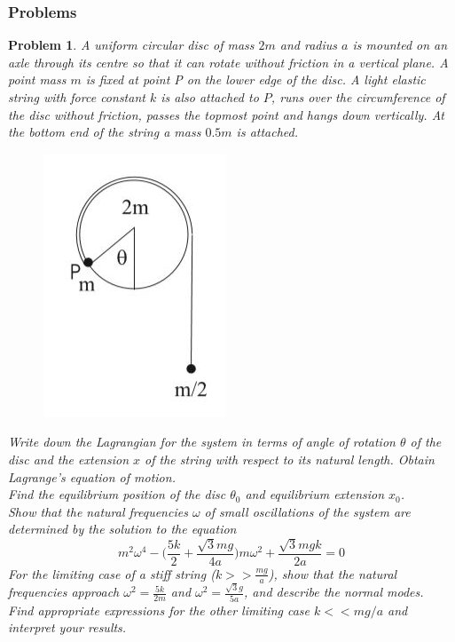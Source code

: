 \documentclass[a4paper]{article}
\theoremstyle{new}
\newtheorem{qns}{Problem}[section]
\begin{document}
\subsubsection{Problems}
\begin{qns}
A uniform circular disc of mass $2m$ and radius $a$ is mounted on an axle through its centre so that it can rotate without friction in a vertical plane. A point mass $m$ is fixed at point P on the lower edge of the disc. A light elastic string with force constant $k$ is also attached to $P$, runs over the circumference of the disc without friction, passes the topmost point and hangs down vertically. At the bottom end of the string a mass $0.5m$ is attached.
\begin{figure}[H]
    \centering
    \includegraphics[scale=0.5]{TP1_Q1_L.JPG}
\end{figure}
Write down the Lagrangian for the system in terms of angle of rotation $\theta$ of the disc and the extension $x$ of the string with respect to its natural length. Obtain Lagrange's equation of motion.\\[5pt]
Find the equilibrium position of the disc $\theta_0$ and equilibrium extension $x_0$.\\[5pt]
Show that the natural frequencies $\omega$ of small oscillations of the system are determined by the solution to the equation
$$m^2\omega^4-\bigg(\frac{5k}{2}+\frac{\sqrt{3}mg}{4a}\bigg)m\omega^2+\frac{\sqrt{3}mgk}{2a}=0$$
For the limiting case of a stiff string ($k>>\frac{mg}{a}$), show that the natural frequencies approach $\omega^2=\frac{5k}{2m}$ and $\omega^2=\frac{\sqrt{3}g}{5a}$, and describe the normal modes.\\[5pt]
Find appropriate expressions for the other limiting case $k<<mg/a$ and interpret your results.
\end{qns}
\end{document}
